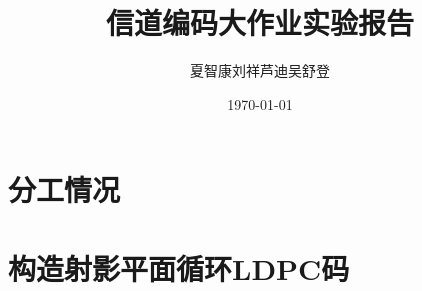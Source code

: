 \documentclass[lang=cn,11pt,a4paper,numbers]{elegantpaper}
\title{信道编码大作业实验报告}
\author{\kaishu\zihao{5} 夏智康\quad 刘祥\quad 芦迪\quad 吴舒登}
\institute{清华大学深圳国际研究生院 信息科学与技术学部，深计研19班}
\date{\today}
\begin{document}
\maketitle


\section{分工情况}



\section{构造射影平面循环LDPC码}
\end{document}
